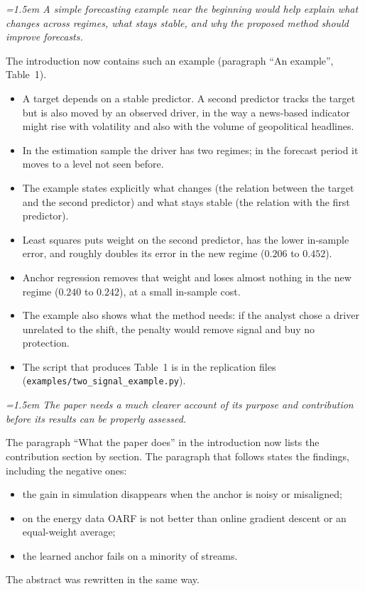 \documentclass[12pt]{article}
\newenvironment{reviewer}{\par\begingroup\itshape\color{black!70}\leftskip=1.5em}{\par\endgroup}
\begin{document}
\begin{reviewer}
A simple forecasting example near the beginning would help explain what changes
across regimes, what stays stable, and why the proposed method should improve
forecasts.
\end{reviewer}

The introduction now contains such an example (paragraph ``An example'', Table~1).
\begin{itemize}
\item A target depends on a stable predictor. A second predictor tracks the target
but is also moved by an observed driver, in the way a news-based indicator might rise
with volatility and also with the volume of geopolitical headlines.
\item In the estimation sample the driver has two regimes; in the forecast period it
moves to a level not seen before.
\item The example states explicitly what changes (the relation between the target and
the second predictor) and what stays stable (the relation with the first predictor).
\item Least squares puts weight on the second predictor, has the lower in-sample error,
and roughly doubles its error in the new regime ($0.206$ to $0.452$).
\item Anchor regression removes that weight and loses almost nothing in the new regime
($0.240$ to $0.242$), at a small in-sample cost.
\item The example also shows what the method needs: if the analyst chose a driver
unrelated to the shift, the penalty would remove signal and buy no protection.
\item The script that produces Table~1 is in the replication files
(\texttt{examples/two\_signal\_example.py}).
\end{itemize}

\begin{reviewer}
The paper needs a much clearer account of its purpose and contribution before its
results can be properly assessed.
\end{reviewer}

The paragraph ``What the paper does'' in the introduction now lists the contribution
section by section. The paragraph that follows states the findings, including the
negative ones:
\begin{itemize}
\item the gain in simulation disappears when the anchor is noisy or misaligned;
\item on the energy data OARF is not better than online gradient descent or an
equal-weight average;
\item the learned anchor fails on a minority of streams.
\end{itemize}
The abstract was rewritten in the same way.
\end{document}
